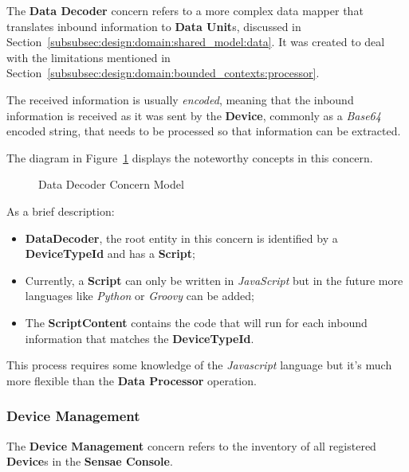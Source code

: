The \textbf{Data Decoder} concern refers to a more complex data mapper that translates inbound information to \textbf{Data Unit}s, discussed in Section~\ref{subsubsec:design:domain:shared_model:data}.
It was created to deal with the limitations mentioned in Section~\ref{subsubsec:design:domain:bounded_contexts:processor}.

The received information is usually \textit{encoded}, meaning that the inbound information is received as it was sent by the \textbf{Device}, commonly as a \textit{Base64} encoded string, that needs to be processed so that information can be extracted.

The diagram in Figure~\ref{fig:design:domain:bounded_contexts:decoder:diagram} displays the noteworthy concepts in this concern.

\begin{figure}[H]
   \centering
  \resizebox{\columnwidth}{!}
  {
     
  }
  \caption[Data Decoder Concern Model]{Data Decoder Concern Model}
  \label{fig:design:domain:bounded_contexts:decoder:diagram}
\end{figure}

As a brief description:

\begin{itemize}
   \item \textbf{DataDecoder}, the root entity in this concern is identified by a \textbf{DeviceTypeId} and has a \textbf{Script};
   \item Currently, a \textbf{Script} can only be written in \textit{JavaScript} but in the future more languages like \textit{Python} or \textit{Groovy} can be added;
   \item The \textbf{ScriptContent} contains the code that will run for each inbound information that matches the \textbf{DeviceTypeId}.
\end{itemize}

This process requires some knowledge of the \textit{Javascript} language but it's much more flexible than the \textbf{Data Processor} operation.

\subsubsection{Device Management}
\label{subsubsec:design:domain:bounded_contexts:device}

The \textbf{Device Management} concern refers to the inventory of all registered \textbf{Device}s in the \textbf{Sensae Console}.

